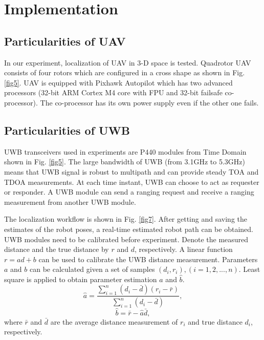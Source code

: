 \documentclass[journal]{IEEEtran}
\begin{document}
\section{Implementation}\label{a7}

\subsection{Particularities of UAV}

In our experiment, localization of UAV in 3-D space is tested. Quadrotor UAV consists of four rotors which are configured in a cross shape as shown in Fig. \ref{fig5}.
UAV is equipped with Pixhawk Autopilot which has two advanced processors (32-bit ARM Cortex M4 core with FPU and 32-bit failsafe co-processor). The co-processor has its own power supply even if the other one fails.   


\subsection{Particularities of UWB}

UWB transceivers used in experiments are P440 modules from Time Domain shown in Fig. \ref{fig5}. The large bandwidth of UWB (from 3.1GHz to 5.3GHz) means that UWB signal is robust to multipath and can provide steady TOA and TDOA measurements. At each time instant, UWB can choose to act as requester or responder. A UWB module can send a ranging request and receive a ranging measurement from another UWB module.

The localization workflow is shown in Fig. \ref{fig7}. After getting and saving the estimates of the robot poses, a real-time estimated robot path can be obtained.
UWB modules need to be calibrated before experiment. Denote the measured distance and the true distance by $r$ and $d$, respectively. A linear function $r = ad+b$ can be used to calibrate the UWB distance measurement. Parameters $a$ and $b$ can be calculated given a set of samples $(d_i,r_i), (i = 1,2,...,n)$. Least square is applied to obtain parameter estimation $\hat a$ and $\hat b$.
\begin{equation}\label{54}
\hat{a} = \frac{\sum_{i=1}^{n}(d_i - \bar {d})(r_i - \bar{r})}{\sum_{i=1}^{n}(d_i - \bar {d})},
\end{equation}
\begin{equation}\label{55}
\hat{b} = \bar{r} - \hat{a}\bar{d},
\end{equation}
where $\bar{r}$ and $\bar{d}$ are the average distance measurement of $r_i$ and true distance $d_i$, respectively. 
\end{document}
